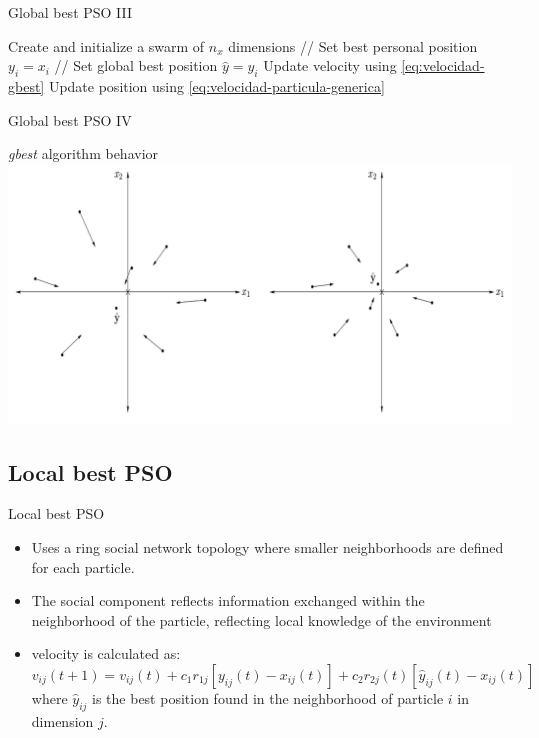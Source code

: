\documentclass[aspectratio=169,compress,10pt]{beamer}
\begin{document}
\begin{frame}{Global best PSO III}
\begin{algorithm}[H]
\scriptsize
\begin{algorithmic}[1] 
\STATE Create and initialize a swarm of $n_x$ dimensions
\REPEAT
		\STATE // Set best personal position
			\STATE $y_i = x_i$
		\ENDIF
		\STATE // Set global best position
			\STATE $\hat{y} = y_i$
		\ENDIF
	\ENDFOR
		\STATE Update velocity using \ref{eq:velocidad-gbest}
		\STATE Update position using \ref{eq:velocidad-particula-generica}
	\ENDFOR
{}
\end{algorithmic} 
\caption{PSO gbest} 
\label{alg:algoritmo-pso-gbest}
\end{algorithm}
\end{frame}

\begin{frame}{Global best PSO IV}
\begin{block}{\emph{gbest} algorithm behavior}
\centering
\includegraphics[scale=0.25]{../resources/gbest-behavior}
\end{block}
\end{frame}

\subsection{Local best PSO}
\begin{frame}{Local best PSO}
\begin{itemize}
	\item Uses a ring social network topology where smaller neighborhoods are defined for each particle.
	\item The social component reflects information exchanged within the neighborhood of the particle, reflecting local knowledge of the environment
	\item velocity is calculated as:
\begin{equation}
	v_{ij}(t+1)=v_{ij}(t) + c_1 r_{1j}[y_{ij}(t) - x_{ij}(t)] + c_2 r_{2j}(t) [\hat{y}_{ij}(t) - x_{ij}(t)]
	\label{eq:velocidad-lbest}
\end{equation}
where $\hat{y}_{ij}$ is the best position found in the neighborhood of particle $i$ in dimension $j$.
\end{itemize}
\end{frame}
\end{document}
